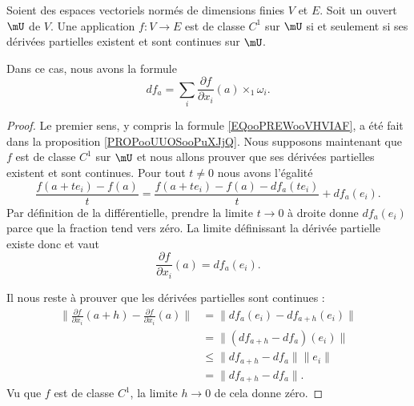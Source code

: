 \begin{theorem}     \label{THOooBEAOooBdvOdr}
	Soient des espaces vectoriels normés de dimensions finies \( V\) et \( E\). Soit un ouvert \( \mU\) de \( V\). Une application \( f\colon V\to E\) est de classe \( C^1\) sur \( \mU\) si et seulement si ses dérivées partielles existent et sont continues sur \( \mU\).

	Dans ce cas, nous avons la formule
	\begin{equation}        \label{EQooPREWooVHVIAF}
		df_a=\sum_i\frac{ \partial f }{ \partial x_i }(a)\times_1 \omega_i.
	\end{equation}
\end{theorem}

\begin{proof}
	Le premier sens, y compris la formule \eqref{EQooPREWooVHVIAF}, a été fait dans la proposition \ref{PROPooUUOSooPuXJjQ}. Nous supposons maintenant que \( f\) est de classe \( C^1\) sur \( \mU\) et nous allons prouver que ses dérivées partielles existent et sont continues. Pour tout \( t\neq 0\) nous avons l'égalité
	\begin{equation}
		\frac{ f(a+te_i)-f(a) }{ t }=\frac{ f(a+te_i)-f(a)-df_a(te_i) }{ t }+df_a(e_i).
	\end{equation}
	Par définition de la différentielle, prendre la limite \( t\to 0\) à droite donne \( df_a(e_i)\) parce que la fraction tend vers zéro. La limite définissant la dérivée partielle existe donc et vaut
	\begin{equation}
		\frac{ \partial f }{ \partial x_i }(a)=df_a(e_i).
	\end{equation}

	Il nous reste à prouver que les dérivées partielles sont continues :
	\begin{subequations}
		\begin{align}
			\| \frac{ \partial f }{ \partial x_i }(a+h)-\frac{ \partial f }{ \partial x_i }(a) \| & =\| df_{a}(e_i)-df_{a+h}(e_i) \|  \\
			                                                                                      & =\| (df_{a+h}-df_a)(e_i) \|       \\
			                                                                                      & \leq \| df_{a+h}-df_a \|\| e_i \| \\
			                                                                                      & = \| df_{a+h}-df_a \|.
		\end{align}
	\end{subequations}
	Vu que \( f\) est de classe \( C^1\), la limite \( h\to 0\) de cela donne zéro.
\end{proof}

